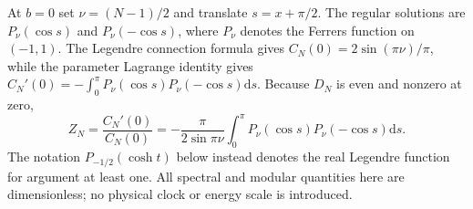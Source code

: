 \documentclass[10pt]{article}
\newcommand{\dd}{\mathrm d}
\begin{document}
At $b=0$ set $\nu=(N-1)/2$ and translate $s=x+\pi/2$.
The regular solutions are $P_\nu(\cos s)$ and $P_\nu(-\cos s)$,
where $P_\nu$ denotes the Ferrers function on $(-1,1)$.
The Legendre connection formula gives
$C_N(0)=2\sin(\pi\nu)/\pi$, while the parameter Lagrange identity gives
$C_N'(0)=-\int_0^\pi P_\nu(\cos s)P_\nu(-\cos s)\dd s$.
Because $D_N$ is even and nonzero at zero,
\begin{equation}
Z_N=\frac{C_N'(0)}{C_N(0)}
=-\frac\pi{2\sin\pi\nu}\int_0^\pi
P_\nu(\cos s)P_\nu(-\cos s)\dd s.
\label{eq:Legendre}
\end{equation}
The notation $P_{-1/2}(\cosh t)$ below instead denotes the real
Legendre function for argument at least one. All spectral and modular
quantities here are dimensionless; no physical clock or energy scale is
introduced.
\end{document}
